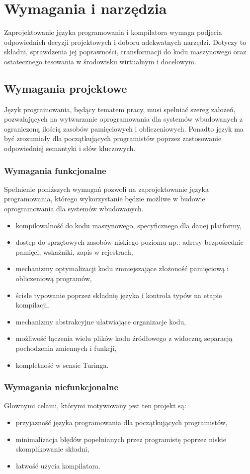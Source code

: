 \chapter{Wymagania i narzędzia}
\label{ch:wymagania-i-narzedzia}
Zaprojektowanie języka programowania i kompilatora wymaga podjęcia odpowiednich decyzji projektowych i doboru adekwatnych narzędzi. Dotyczy to składni, sprawdzenia jej poprawności, transformacji do kodu maszynowego oraz ostatecznego tesowania w środowisku wirtualnym i docelowym.
\section{Wymagania projektowe}

Język programowania, będący tematem pracy, musi spełniać szereg założeń, pozwalających na wytwarzanie oprogramowania dla systemów wbudowanych z ograniczoną ilością zasobów pamięciowych i obliczeniowych. Ponadto język ma być zrozumiały dla początkujących programistów poprzez zastosowanie odpowiedniej semantyki i słów kluczowych.

\subsection{Wymagania funkcjonalne}
Spełnienie poniższych wymagań pozwoli na zaprojektowanie języka programowania, którego wykorzystanie będzie możliwe w budowie oprogramowania dla systemów wbudowanych.
\begin{itemize}
\item kompilowalność do kodu maszynowego, specyficznego dla danej platformy,
\item dostęp do sprzętowych zasobów niskiego poziomu np.: adresy bezpośrednie pamięci, wskaźniki, zapis w rejestrach,
\item mechanizmy optymalizacji kodu zmniejszające złożoność pamięciową i obliczeniową programów,
\item ścisłe typowanie poprzez składnię języka i kontrola typów na etapie kompilacji,
\item mechanizmy abstrakcyjne ułatwiające organizacje kodu,
\item możliwość łączenia wielu plików kodu źródłowego z widoczną separacją pochodzenia zmiennych i funkcji,
\item kompletność w sensie Turinga.
\end{itemize}

\subsection{Wymagania niefunkcjonalne}
Głownymi celami, którymi motywowany jest ten projekt są:
\begin{itemize}
\item przyjazność języka programowania dla początkujących programistów,
\item minimalizacja błędów popełnianych przez programistę poprzez niskie skomplikowanie składni,
\item łatwość użycia kompilatora.
\end{itemize}

